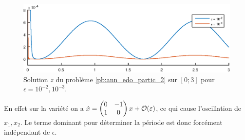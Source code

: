 \begin{figure}[!h]
\centering
\includegraphics[width=.8\textwidth]{img/ann/solution_z_cas2.eps}
\caption{Solution $z$ du problème \eqref{pb:ann_edo_partic_2} sur $[0; 3]$ pour $\epsilon = 10^{-2},10^{-3}$.}
\end{figure}
En effet sur la variété on a $\dot{x} = \begin{pmatrix}
0 & -1 \\ 1 & 0 
\end{pmatrix} x + \mathcal{O}(\varepsilon)$, ce qui cause l'oscillation de $x_1,x_2$. 
Le terme dominant pour déterminer la période est donc forcément indépendant de $\epsilon$. 
